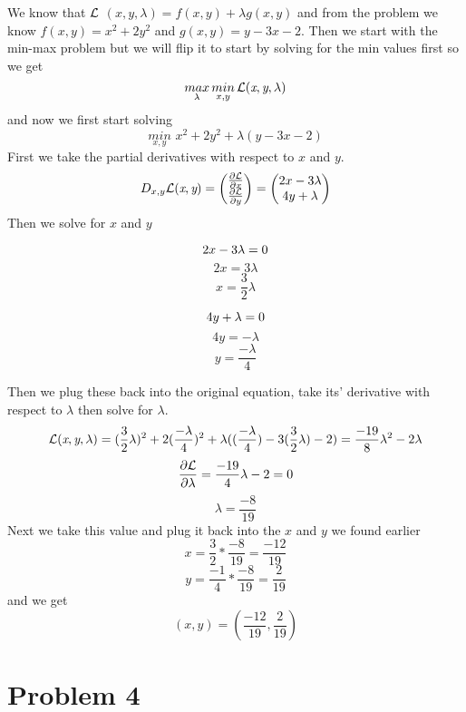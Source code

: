 \documentclass[12pt]{article}
\begin{document}
We know that $\cal{L}$ $(x, y, \lambda) = f(x, y) + \lambda g(x, y)$ and from the problem we know $f(x, y) = x^{2} + 2y^{2}$ and $g(x, y) = y - 3x - 2$.
Then we start with the min-max problem but we will flip it to start by solving for the min values first so we get
\[
\underset{\lambda}{max}\, \underset{x, y}{min} \, \cal{L} (\textit{x}, \textit{y}, \lambda)
\]
and now we first start solving
\[
\underset{x, y}{min} \,\, x^{2} + 2y^{2} + \lambda (y - 3x - 2)
\]
First we take the partial derivatives with respect to $x$ and $y$.
\[
D_{x, y} \cal{L} (\textit{x}, \textit{y}) = 
\begin{pmatrix}
\frac{\partial\cal{L}}{\partial x} \\
\frac{\partial\cal{L}}{\partial y}
\end{pmatrix} =
\begin{pmatrix}
2x - 3\lambda \\
4y + \lambda
\end{pmatrix} 
\]
Then we solve for $x$ and $y$
\begin{minipage}[t]{0.2\textwidth}
\[
2x - 3\lambda = 0 \\
\]
\[
2x = 3\lambda 
\]
\[
x = \frac{3}{2}\lambda
\]    
\end{minipage}
\hfill
\begin{minipage}[t]{0.2\textwidth}
\[
4y + \lambda = 0 \\
\]
\[
4y = -\lambda
\]
\[
y = \frac{-\lambda}{4}
\]
\end{minipage}

Then we plug these back into the original equation, take its' derivative with respect to $\lambda$ then solve for $\lambda$.
\[
{\cal{L}} (\textit{x}, \textit{y}, \lambda) = 
(\frac{3}{2}\lambda)^{2} + 2(\frac{-\lambda}{4})^{2} + 
\lambda ((\frac{-\lambda}{4}) - 3(\frac{3}{2}\lambda) - 2)
= \frac{-19}{8}\lambda^{2} - 2\lambda
\]
\[
\frac{\partial\cal{L}}{\partial\lambda} = \frac{-19}{4}\lambda - 2 = 0
\]
\[
\lambda = \frac{-8}{19}
\]
Next we take this value and plug it back into the $x$ and $y$ we found earlier
\[
x = \frac{3}{2}*\frac{-8}{19} = \frac{-12}{19}
\]
\[
y = \frac{-1}{4} * \frac{-8}{19} = \frac{2}{19}
\]
and we get
\[
\boxed{(x, y) = \left(\frac{-12}{19}, \frac{2}{19}\right)}
\]


\section*{Problem 4}
\end{document}

